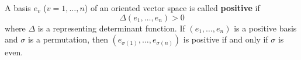 A basis $e_v$ ($v = 1, \ldots, n$) of an oriented vector space is called \textbf{positive} if
$$\Delta(e_1, \ldots, e_n) > 0$$
where $\Delta$ is a representing determinant function. If $(e_1, \ldots, e_n)$ is a positive basis and $\sigma$ is a permutation, then $(e_{\sigma(1)}, \ldots, e_{\sigma(n)})$ is positive if and only if $\sigma$ is even.
